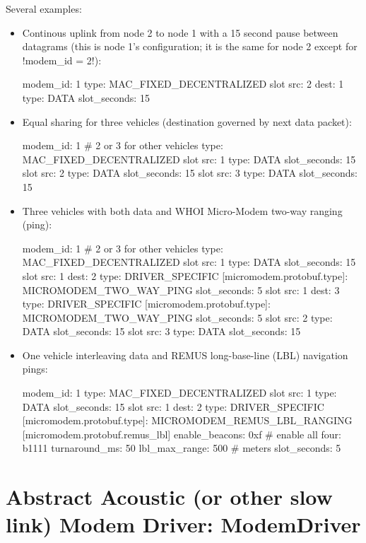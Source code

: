 Several examples:
\begin{itemize}
\item Continous uplink from node 2 to node 1 with a 15 second pause between datagrams (this is node 1's configuration; it is the same for node 2 except for !modem_id = 2!):
\begin{boxedverbatim}
modem_id: 1
type: MAC_FIXED_DECENTRALIZED
slot { src: 2  dest: 1  type: DATA  slot_seconds: 15 }
\end{boxedverbatim}
\resetbvlinenumber
\item Equal sharing for three vehicles (destination governed by next data packet):
\begin{boxedverbatim}
modem_id: 1 # 2 or 3 for other vehicles
type: MAC_FIXED_DECENTRALIZED
slot { src: 1  type: DATA  slot_seconds: 15 }
slot { src: 2  type: DATA  slot_seconds: 15 }
slot { src: 3  type: DATA  slot_seconds: 15 }
\end{boxedverbatim}
\resetbvlinenumber
\item Three vehicles with both data and WHOI Micro-Modem two-way ranging (ping):
\begin{boxedverbatim}
modem_id: 1 # 2 or 3 for other vehicles
type: MAC_FIXED_DECENTRALIZED
slot { src: 1  type: DATA  slot_seconds: 15 }
slot { 
  src: 1
  dest: 2
  type: DRIVER_SPECIFIC 
  [micromodem.protobuf.type]: MICROMODEM_TWO_WAY_PING
  slot_seconds: 5
}
slot { 
  src: 1
  dest: 3
  type: DRIVER_SPECIFIC 
  [micromodem.protobuf.type]: MICROMODEM_TWO_WAY_PING
  slot_seconds: 5
}
slot { src: 2  type: DATA  slot_seconds: 15 }
slot { src: 3  type: DATA  slot_seconds: 15 }
\end{boxedverbatim}
\resetbvlinenumber
\item One vehicle interleaving data and REMUS long-base-line (LBL) navigation pings:
\begin{boxedverbatim}
modem_id: 1
type: MAC_FIXED_DECENTRALIZED
slot { src: 1  type: DATA  slot_seconds: 15 }
slot { 
  src: 1
  dest: 2
  type: DRIVER_SPECIFIC 
  [micromodem.protobuf.type]: MICROMODEM_REMUS_LBL_RANGING
  [micromodem.protobuf.remus_lbl] {
    enable_beacons: 0xf   # enable all four: b1111
    turnaround_ms: 50
    lbl_max_range: 500 # meters
  }
  slot_seconds: 5
}
\end{boxedverbatim}
\resetbvlinenumber
\end{itemize}

\section{Abstract Acoustic (or other slow link) Modem Driver: ModemDriver} \label{sec:driver}

